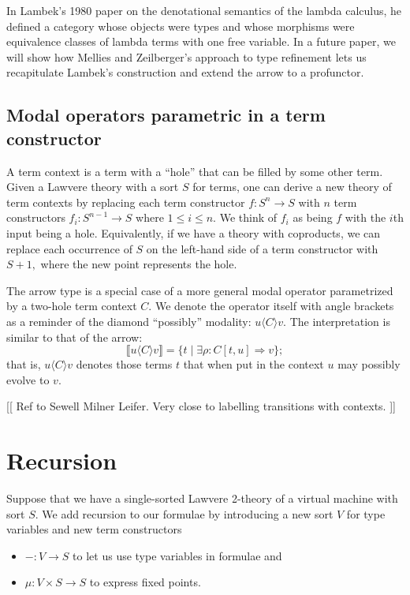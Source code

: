 \documentclass{article}
\newcommand{\interp}[1]{\llbracket #1 \rrbracket}
\newcommand{\maps}{\colon}
\begin{document}
In Lambek's 1980 paper \cite{Lambek} on the denotational semantics of the lambda calculus, he defined a category whose objects were types and whose morphisms were equivalence classes of lambda terms with one free variable.  In a future paper, we will show how Mellies and Zeilberger's approach to type refinement lets us recapitulate Lambek's construction and extend the arrow to a profunctor.

\subsection{Modal operators parametric in a term constructor}

A term context is a term with a ``hole'' that can be filled by some other term.  Given a Lawvere theory with a sort $S$ for terms, one can derive a new theory of term contexts by replacing each term constructor $f\maps S^n \to S$ with $n$ term constructors $f_i\maps S^{n-1} \to S$ where $1 \le i \le n$.  We think of $f_i$ as being $f$ with the $i$th input being a hole.  Equivalently, if we have a theory with coproducts, we can replace each occurrence of $S$ on the left-hand side of a term constructor with $S+1,$ where the new point represents the hole.

The arrow type is a special case of a more general modal operator parametrized by a two-hole term context $C.$  We denote the operator itself with angle brackets as a reminder of the diamond ``possibly'' modality: $u \langle C \rangle v.$  The interpretation is similar to that of the arrow:
\[ \interp{u \langle C\rangle v} = \{ t \;|\; \exists \rho\maps C[t, u] \Rightarrow v \}; \]
that is, $u \langle C\rangle v$ denotes those terms $t$ that when put in the context $u$ may possibly evolve to $v.$

[[ Ref to Sewell Milner Leifer.  Very close to labelling transitions with contexts. ]]

\section{Recursion}

Suppose that we have a single-sorted Lawvere 2-theory of a virtual machine with sort $S$.  We add recursion to our formulae by introducing a new sort $V$ for type variables and new term constructors 
\begin{itemize}
  \item $- \maps V \to S$ to let us use type variables in formulae and
  \item $\mu\maps V\times S \to S$ to express fixed points.
\end{itemize}
\end{document}
